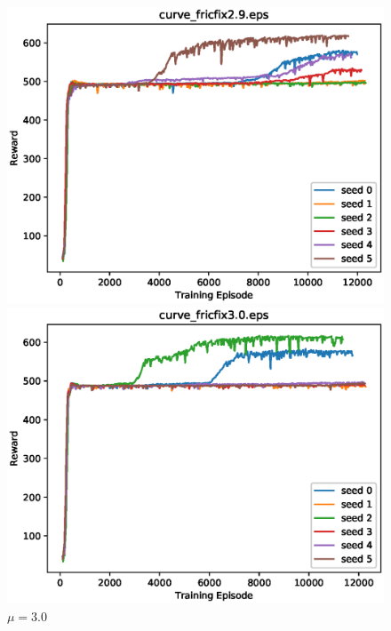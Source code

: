\begin{figure}[p]
 \begin{minipage}{0.49\hsize}
  \begin{center}
 \includegraphics[width=.99\linewidth]{./fig/curve_fricfix2.9.eps}
  \caption{$\mu=2.9$
  }
  \end{center}
 \end{minipage}
 \begin{minipage}{0.49\hsize}
   \begin{center}
 \includegraphics[width=.99\linewidth]{./fig/curve_fricfix3.0.eps}
  \caption{$\mu=3.0$
     }
  \end{center}
 \end{minipage}
\end{figure}
